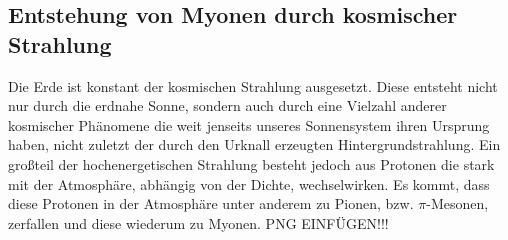 \subsection{Entstehung von Myonen durch kosmischer Strahlung}
Die Erde ist konstant der kosmischen Strahlung ausgesetzt. Diese entsteht nicht nur durch die erdnahe Sonne, sondern auch durch eine Vielzahl anderer kosmischer Phänomene die weit jenseits unseres Sonnensystem ihren Ursprung haben, nicht zuletzt der
durch den Urknall erzeugten Hintergrundstrahlung. Ein großteil der hochenergetischen Strahlung besteht jedoch aus Protonen die stark mit der Atmosphäre, abhängig von der Dichte, wechselwirken.
Es kommt, dass diese Protonen in der Atmosphäre unter anderem zu Pionen, bzw. $\pi$-Mesonen, zerfallen und diese wiederum zu Myonen. 
%
PNG EINFÜGEN!!!
